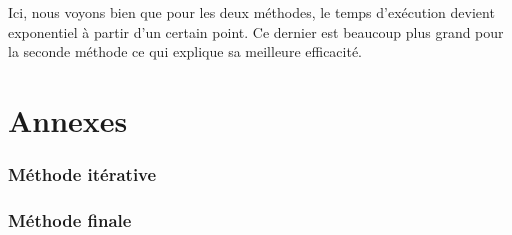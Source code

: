 \documentclass{article}
\newcommand{\code}[3]{}
\begin{document}
Ici, nous voyons bien que pour les deux méthodes, le temps d'exécution devient exponentiel à partir d'un certain point. Ce dernier est beaucoup plus grand pour la seconde méthode ce qui explique sa meilleure efficacité.

\newpage
\part{Annexes}
\section*{Méthode itérative}
\code{1}{38}{Problem119_1.py}

\newpage
\section*{Méthode finale}
\code{1}{41}{Problem119_2.py}
\end{document}
